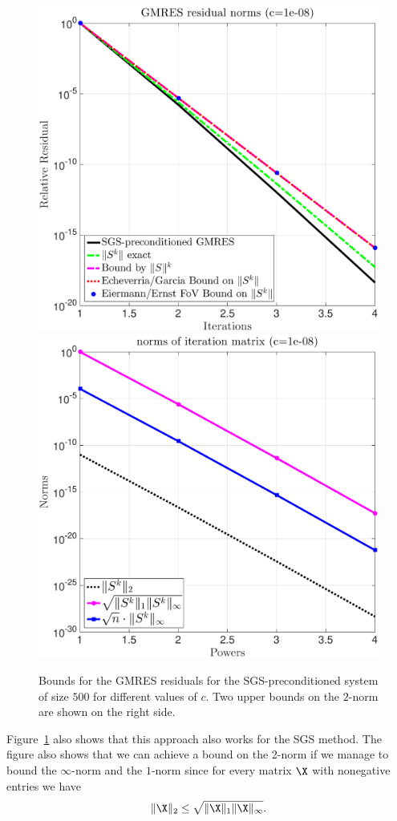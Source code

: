 \begin{figure}[h!]
\includegraphics[scale=0.20]{figures/Bounds_1e_neg8_500}
\includegraphics[scale=0.20]{figures/norm_1e_neg8_500_prec.eps}\\
\caption{Bounds for the GMRES residuals for the SGS-preconditioned system of
size $500$ for different values of $c$. Two upper bounds on the $2$-norm are
shown on the right side.}
\label{fig:1D:flow_follow}
\end{figure}

Figure~\ref{fig:1D:flow_follow} also shows that this approach also works for
the SGS method. The figure also shows that we can achieve a bound on the 2-norm
if we manage to bound the $\infty$-norm and the $1$-norm since for every matrix
$\X$ with nonegative entries we have~\cite{GolVan13}
\[
\|\X\|_2\leq\sqrt{\|\X\|_1\|\X\|_{\infty}}.
\]
